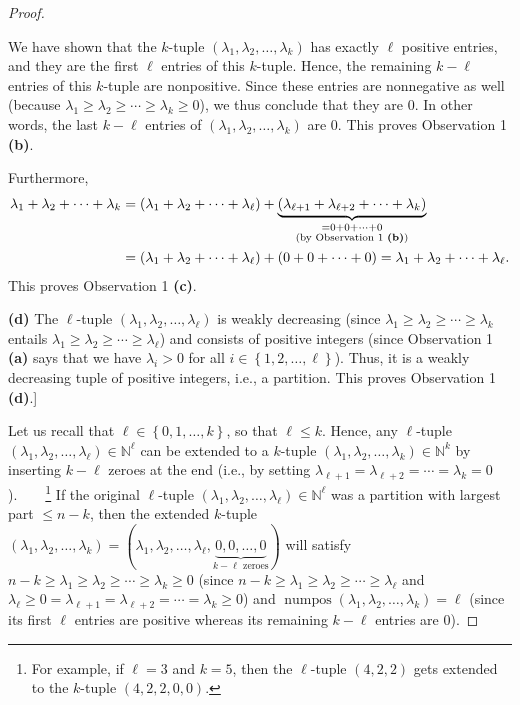 \begin{proof}
\begin{fineprint}
We have shown that the $k$-tuple $\left(  \lambda_{1},\lambda_{2}%
,\ldots,\lambda_{k}\right)  $ has exactly $\ell$ positive entries, and they
are the first $\ell$ entries of this $k$-tuple. Hence, the remaining $k-\ell$
entries of this $k$-tuple are nonpositive. Since these entries are nonnegative
as well (because $\lambda_{1}\geq\lambda_{2}\geq\cdots\geq\lambda_{k}\geq0$),
we thus conclude that they are $0$. In other words, the last $k-\ell$ entries
of $\left(  \lambda_{1},\lambda_{2},\ldots,\lambda_{k}\right)  $ are $0$. This
proves Observation 1 \textbf{(b)}.

Furthermore,%
\begin{align*}
\lambda_{1}+\lambda_{2}+\cdots+\lambda_{k}  &  =\left(  \lambda_{1}%
+\lambda_{2}+\cdots+\lambda_{\ell}\right)  +\underbrace{\left(  \lambda
_{\ell+1}+\lambda_{\ell+2}+\cdots+\lambda_{k}\right)  }_{\substack{=0+0+\cdots
+0\\\text{(by Observation 1 \textbf{(b)})}}}\\
&  =\left(  \lambda_{1}+\lambda_{2}+\cdots+\lambda_{\ell}\right)  +\left(
0+0+\cdots+0\right)  =\lambda_{1}+\lambda_{2}+\cdots+\lambda_{\ell}.
\end{align*}
This proves Observation 1 \textbf{(c)}.

\textbf{(d)} The $\ell$-tuple $\left(  \lambda_{1},\lambda_{2},\ldots
,\lambda_{\ell}\right)  $ is weakly decreasing (since $\lambda_{1}\geq
\lambda_{2}\geq\cdots\geq\lambda_{k}$ entails $\lambda_{1}\geq\lambda_{2}%
\geq\cdots\geq\lambda_{\ell}$) and consists of positive integers (since
Observation 1 \textbf{(a)} says that we have $\lambda_{i}>0$ for all
$i\in\left\{  1,2,\ldots,\ell\right\}  $). Thus, it is a weakly decreasing
tuple of positive integers, i.e., a partition. This proves Observation 1
\textbf{(d)}.] \medskip
\end{fineprint}

Let us recall that $\ell\in\left\{  0,1,\ldots,k\right\}  $, so that $\ell\leq
k$. Hence, any $\ell$-tuple $\left(  \lambda_{1},\lambda_{2},\ldots
,\lambda_{\ell}\right)  \in\mathbb{N}^{\ell}$ can be extended to a $k$-tuple
$\left(  \lambda_{1},\lambda_{2},\ldots,\lambda_{k}\right)  \in\mathbb{N}^{k}$
by inserting $k-\ell$ zeroes at the end (i.e., by setting $\lambda_{\ell
+1}=\lambda_{\ell+2}=\cdots=\lambda_{k}=0$).\ \ \ \ \footnote{For example, if
$\ell=3$ and $k=5$, then the $\ell$-tuple $\left(  4,2,2\right)  $ gets
extended to the $k$-tuple $\left(  4,2,2,0,0\right)  $.} If the original
$\ell$-tuple $\left(  \lambda_{1},\lambda_{2},\ldots,\lambda_{\ell}\right)
\in\mathbb{N}^{\ell}$ was a partition with largest part $\leq n-k$, then the
extended $k$-tuple $\left(  \lambda_{1},\lambda_{2},\ldots,\lambda_{k}\right)
=\left(  \lambda_{1},\lambda_{2},\ldots,\lambda_{\ell},\underbrace{0,0,\ldots
,0}_{k-\ell\text{ zeroes}}\right)  $ will satisfy $n-k\geq\lambda_{1}%
\geq\lambda_{2}\geq\cdots\geq\lambda_{k}\geq0$ (since $n-k\geq\lambda_{1}%
\geq\lambda_{2}\geq\cdots\geq\lambda_{\ell}$ and $\lambda_{\ell}\geq
0=\lambda_{\ell+1}=\lambda_{\ell+2}=\cdots=\lambda_{k}\geq0$) and
$\operatorname*{numpos}\left(  \lambda_{1},\lambda_{2},\ldots,\lambda
_{k}\right)  =\ell$ (since its first $\ell$ entries are positive whereas its
remaining $k-\ell$ entries are $0$).


\end{proof}

